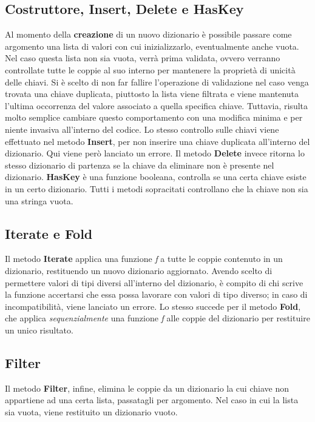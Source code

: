 \documentclass[10pt, italian, openany]{book}
\begin{document}
\subsection{Costruttore, Insert, Delete e HasKey}
Al momento della \textbf{creazione} di un nuovo dizionario è possibile passare come argomento una lista di valori con cui inizializzarlo, eventualmente anche vuota. Nel caso questa lista non sia vuota, verrà prima validata, ovvero verranno controllate tutte le coppie al suo interno per mantenere la proprietà di unicità delle chiavi. Si è scelto di non far fallire l'operazione di validazione nel caso venga trovata una chiave duplicata, piuttosto la lista viene filtrata e viene mantenuta l'ultima occorrenza del valore associato a quella specifica chiave. Tuttavia, risulta molto semplice cambiare questo comportamento con una modifica minima e per niente invasiva all'interno del codice.  Lo stesso controllo sulle chiavi viene effettuato nel metodo \textbf{Insert}, per non inserire una chiave duplicata all'interno del dizionario. Qui viene però lanciato un errore. Il metodo \textbf{Delete} invece ritorna lo stesso dizionario di partenza se la chiave da eliminare non è presente nel dizionario. \textbf{HasKey} è una funzione booleana, controlla se una certa chiave esiste in un certo dizionario. Tutti i metodi sopracitati controllano che la chiave non sia una stringa vuota.

\subsection{Iterate e Fold}
Il metodo \textbf{Iterate} applica una funzione \textit{f} a tutte le coppie contenuto in un dizionario, restituendo un nuovo dizionario aggiornato. Avendo scelto di permettere valori di tipi diversi all'interno del dizionario, è compito di chi scrive la funzione accertarsi che essa possa lavorare con valori di tipo diverso; in caso di incompatibilità, viene lanciato un errore. Lo stesso succede per il metodo \textbf{Fold}, che applica \textit{sequenzialmente} una funzione \textit{f} alle coppie del dizionario per restituire un unico risultato.

\subsection{Filter}
Il metodo \textbf{Filter}, infine, elimina le coppie da un dizionario la cui chiave non appartiene ad una certa lista, passatagli per argomento. Nel caso in cui la lista sia vuota, viene restituito un dizionario vuoto.
\end{document}
